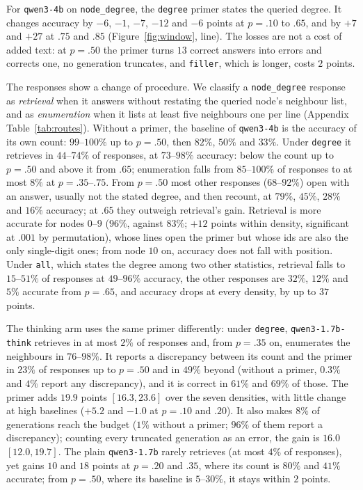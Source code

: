 \documentclass[11pt]{article}
\begin{document}
For \texttt{qwen3-4b} on \texttt{node\_degree}, the \texttt{degree} primer
states the queried degree. It changes accuracy by $-6$, $-1$, $-7$, $-12$ and
$-6$ points at $p{=}.10$ to $.65$, and by $+7$ and $+27$ at $.75$ and $.85$
(Figure~\ref{fig:window}, line). The losses are not a cost of added text: at
$p{=}.50$ the primer turns $13$ correct answers into errors and corrects one,
no generation truncates, and \texttt{filler}, which is longer, costs $2$
points.

The responses show a change of procedure. We classify a \texttt{node\_degree}
response as \emph{retrieval} when it answers without restating the queried
node's neighbour list, and as \emph{enumeration} when it lists at least five
neighbours one per line (Appendix Table~\ref{tab:routes}). Without a primer,
the baseline of \texttt{qwen3-4b} is the accuracy of its own count:
$99$--$100\%$ up to $p{=}.50$, then $82\%$, $50\%$ and $33\%$. Under
\texttt{degree} it retrieves in $44$--$74\%$ of responses, at $73$--$98\%$
accuracy: below the count up to $p{=}.50$ and above it from $.65$; enumeration
falls from $85$--$100\%$ of responses to at most $8\%$ at $p{=}.35$--$.75$.
From $p{=}.50$ most other responses ($68$--$92\%$) open with an answer, usually
not the stated degree, and then recount, at $79\%$, $45\%$, $28\%$ and $16\%$
accuracy; at $.65$ they outweigh retrieval's gain. Retrieval is more accurate
for nodes $0$--$9$ ($96\%$, against $83\%$; $+12$ points within density,
significant at $.001$ by permutation), whose lines open the primer but whose
ids are also the only single-digit ones; from node $10$ on, accuracy does not
fall with position. Under \texttt{all}, which
states the degree among two other statistics, retrieval falls to $15$--$51\%$
of responses at $49$--$96\%$ accuracy, the other responses are $32\%$, $12\%$
and $5\%$ accurate from $p{=}.65$, and accuracy drops at every density, by up
to $37$ points.

The thinking arm uses the same primer differently: under \texttt{degree},
\texttt{qwen3-1.7b-think} retrieves in at most $2\%$ of responses and, from
$p{=}.35$ on, enumerates the neighbours in $76$--$98\%$. It reports a
discrepancy between its count and the primer in $23\%$ of responses up to
$p{=}.50$ and in $49\%$ beyond (without a primer, $0.3\%$ and $4\%$ report any
discrepancy), and it is correct in $61\%$ and $69\%$ of those. The primer adds
$19.9$ points $[16.3, 23.6]$ over the seven densities, with little change at
high baselines ($+5.2$ and $-1.0$ at $p{=}.10$ and $.20$). It also makes $8\%$
of generations reach the budget ($1\%$ without a primer; $96\%$ of them report
a discrepancy); counting every truncated generation as an error, the gain is
$16.0$ $[12.0, 19.7]$. The plain
\texttt{qwen3-1.7b} rarely retrieves (at most $4\%$ of responses), yet gains
$10$ and $18$ points at $p{=}.20$ and $.35$, where its count is $80\%$ and
$41\%$ accurate; from $p{=}.50$, where its baseline is $5$--$30\%$, it stays
within $2$ points.
\end{document}
